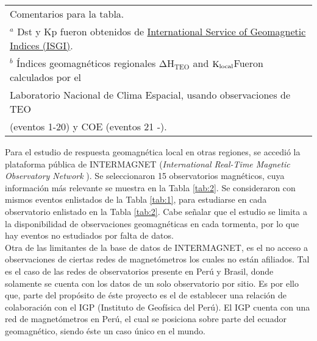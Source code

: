\documentclass[preprint,12pt]{article}
\begin{document}
\begin{table*}[h!]
\begin{tabular}{cccccc}
		\multicolumn{6}{l}{Comentarios para la tabla.} \\
		\multicolumn{6}{l}{$^a$ Dst y Kp fueron obtenidos de \href{http://isgi.unistra.fr/data_download.php}{International Service of Geomagnetic Indices (ISGI)}.}\\
		\multicolumn{6}{l}{$^b$ Índices geomagnéticos regionales $\mathrm{\Delta H_{TEO}}$ and ${\rm K_{local}}$Fueron calculados por el } \\
		\multicolumn{6}{l}{Laboratorio Nacional de Clima Espacial, usando observaciones de TEO }\\ 
		\multicolumn{6}{l}{(eventos 1-20) y COE (eventos 21 -).} \end{tabular}
\end{table*}



Para el estudio de respuesta geomagnética local en otras regiones, se accedió la plataforma pública de INTERMAGNET (\textit{International Real-Time Magnetic Observatory Network} \citep{intermagnet}). Se seleccionaron 15 observatorios magnéticos, cuya información más relevante se muestra en la Tabla \ref{tab:2}. Se consideraron con mismos eventos enlistados de la Tabla \ref{tab:1}, para estudiarse en cada observatorio enlistado en la Tabla \ref{tab:2}. Cabe señalar que el estudio se limita a la disponibilidad de observaciones geomagnéticas en cada tormenta, por lo que hay eventos no estudiados por falta de datos. \\


Otra de las limitantes de la base de datos de INTERMAGNET, es el no acceso a observaciones de ciertas redes de magnetómetros los cuales no están afiliados. Tal es el caso de las redes de observatorios presente en Perú y Brasil, donde solamente se cuenta con los datos de un solo observatorio por sitio. Es por ello que, parte del propósito de éste proyecto es el de establecer una relación de colaboración con el IGP (Instituto de Geofísica del Perú). El IGP cuenta con una red de magnetómetros en Perú, el cual se posiciona sobre parte del ecuador geomagnético, siendo éste un caso único en el mundo.\\ 
\end{document}
